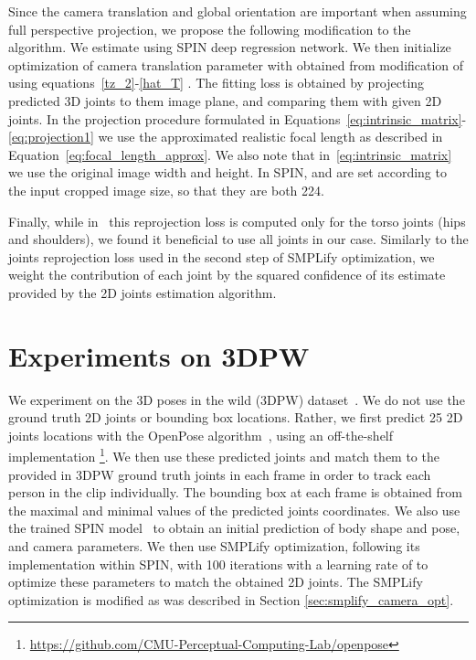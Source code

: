 \documentclass[runningheads]{llncs}
\begin{document}
Since the camera translation and global orientation are important when assuming full perspective projection, we propose the following modification to the algorithm. We estimate  using SPIN deep regression network. We then initialize optimization of camera translation parameter  with  obtained from modification of  using equations~\ref{tz_2}-\ref{hat_T} . The fitting loss is obtained by projecting predicted 3D joints to them image plane, and comparing them with given 2D joints. In the projection procedure formulated in Equations~\ref{eq:intrinsic_matrix}-\ref{eq:projection1} we use the approximated realistic focal length as described in Equation~\ref{eq:focal_length_approx}. We also note that in~\ref{eq:intrinsic_matrix} we use the original image width and height. In SPIN,  and  are set according to the input cropped image size, so that they are both 224. 

Finally, while in~\cite{kolotouros2019learning}  this reprojection loss is computed only for the torso joints (hips and shoulders), we found it beneficial to use all joints in our case. Similarly to the joints reprojection loss used in the second step of SMPLify optimization, we weight the contribution of each joint by the squared confidence of its estimate provided by the 2D joints estimation algorithm.   


\section{Experiments on 3DPW}

We experiment on the 3D poses in the wild (3DPW) dataset~\cite{vonMarcard2018}. We do not use the ground truth 2D joints or bounding box locations. Rather, we first predict 25 2D joints locations with the OpenPose algorithm~\cite{8765346,cao2017realtime}, using an off-the-shelf implementation \footnote{\href{https://github.com/CMU-Perceptual-Computing-Lab/openpose}{https://github.com/CMU-Perceptual-Computing-Lab/openpose}}. We then use these predicted joints and match them to the provided in 3DPW ground truth joints in each frame in order to track each person in the clip individually. The bounding box at each frame is obtained from the maximal and minimal values of the predicted joints coordinates.
We also use the trained SPIN model~\cite{kolotouros2019learning} to obtain an initial prediction of body shape and pose, and camera parameters. We then use SMPLify optimization, following its implementation within SPIN, with 100 iterations with a learning rate of  to optimize these parameters to match the obtained 2D joints. The SMPLify optimization is modified as was described in Section \ref{sec:smplify_camera_opt}. 
\end{document}
